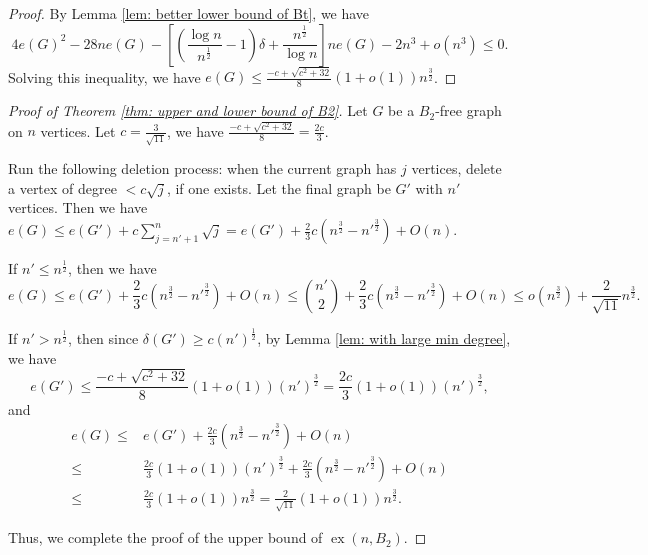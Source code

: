 \documentclass[11pt,a4paper]{article}
\theoremstyle{definition}
\DeclareMathOperator{\ex}{ex}
\begin{document}
\begin{proof}
            By Lemma \ref{lem: better lower bound of Bt}, we have
            \begin{equation*}
                4 e(G)^2 -28 n e(G) - \left[\left(\frac{\log n }{n^{\frac{1}{2}}} - 1\right) \delta + \frac{n^{\frac{1}{2}}}{\log n}\right]n e(G) -2 n^3 + o(n^3) \leq 0.
            \end{equation*}
            Solving this inequality, we have $e(G) \leq \frac{-c + \sqrt{c^2 + 32}}{8} (1 + o(1)) n^{\frac{3}{2}}$.
        \end{proof}

        \begin{proof}[Proof of Theorem \ref{thm: upper and lower bound of B2}]
            Let $G$ be a $B_2$-free graph on $n$ vertices.
            Let $c=\frac{3}{\sqrt{11}}$, we have $\frac{-c + \sqrt{c^2 + 32}}{8} = \frac{2c}{3}$.

            Run the following deletion process: when the current graph has $j$ vertices, delete a vertex of degree $< c \sqrt{j}$, if one exists.
            Let the final graph be $G'$ with $n'$ vertices.
            Then we have $e(G) \leq e(G') + c\sum_{j=n'+1}^{n} \sqrt{j} = e(G') + \frac{2}{3} c (n^{\frac{3}{2}} - n'^{\frac{3}{2}}) + O(n)$.
            
            
            If $n' \leq n^{\frac{1}{2}}$, then we have
            $$e(G) \leq e(G') + \frac{2}{3} c (n^{\frac{3}{2}} - n'^{\frac{3}{2}}) + O(n) \leq \binom{n'}{2}+ \frac{2}{3} c (n^{\frac{3}{2}} - n'^{\frac{3}{2}}) + O(n) \leq o(n^{\frac{3}{2}})+\frac{2}{\sqrt{11}}n^{\frac{3}{2}}.$$
            
            If $n'> n^{\frac{1}{2}}$, then since $\delta(G') \geq c(n')^{\frac{1}{2}}$, by Lemma \ref{lem: with large min degree}, we have
            \begin{equation*}
                e(G') \leq \frac{-c + \sqrt{c^2 + 32}}{8} (1 + o(1)) (n')^{\frac{3}{2}} = \frac{2c}{3} (1+o(1)) (n')^{\frac{3}{2}},
            \end{equation*}
            and
            \begin{align*}
                e(G) \leq& e(G') + \frac{2c}{3}(n^{\frac{3}{2}}-n'^{\frac{3}{2}}) + O(n) \\
                \leq& \frac{2c}{3} (1 + o(1)) (n')^{\frac{3}{2}}+\frac{2c}{3}(n^{\frac{3}{2}}-n'^{\frac{3}{2}})+O(n) \\
                \leq& \frac{2c}{3}(1+o(1))n^{\frac{3}{2}} = \frac{2}{\sqrt{11}}(1+o(1))n^{\frac{3}{2}}.
            \end{align*}
                       
            Thus, we complete the proof of the upper bound of $\ex(n,B_2)$.
        \end{proof}
\end{document}

